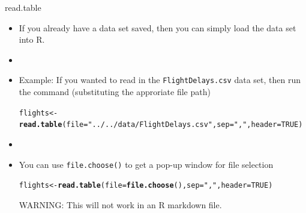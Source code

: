 \documentclass[10pt]{beamer}\usepackage[]{graphicx}\usepackage[]{color}
\makeatletter
\newcommand{\hlnum}[1]{\textcolor[rgb]{0.686,0.059,0.569}{#1}}%
\newcommand{\hlstr}[1]{\textcolor[rgb]{0.192,0.494,0.8}{#1}}%
\newcommand{\hlstd}[1]{\textcolor[rgb]{0.345,0.345,0.345}{#1}}%
\newcommand{\hlkwb}[1]{\textcolor[rgb]{0.69,0.353,0.396}{#1}}%
\newcommand{\hlkwc}[1]{\textcolor[rgb]{0.333,0.667,0.333}{#1}}%
\newcommand{\hlkwd}[1]{\textcolor[rgb]{0.737,0.353,0.396}{\textbf{#1}}}%
\newenvironment{kframe}{%
 \def\at@end@of@kframe{}%
 \ifinner\ifhmode%
  \def\at@end@of@kframe{\end{minipage}}%
  \begin{minipage}{\columnwidth}%
 \fi\fi%
 \def\FrameCommand##1{\hskip\@totalleftmargin \hskip-\fboxsep
 \colorbox{shadecolor}{##1}\hskip-\fboxsep
     \hskip-\linewidth \hskip-\@totalleftmargin \hskip\columnwidth}%
 \MakeFramed {\advance\hsize-\width
   \@totalleftmargin\z@ \linewidth\hsize
   \@setminipage}}%
 {\par\unskip\endMakeFramed%
 \at@end@of@kframe}
\newenvironment{knitrout}{}{} %
\makeatother
\begin{document}
\begin{frame}[fragile]{read.table}

\begin{itemize}
\item  If you already have a data set saved, then you can simply load
the data set into R.
\item[]
\item  Example: If you wanted to read in the \texttt{FlightDelays.csv} data set, then run the command (substituting the approriate file path)

\begin{knitrout}\scriptsize
{}\color{fgcolor}\begin{kframe}
\begin{alltt}
\hlstd{flights} \hlkwb{<-} \hlkwd{read.table}\hlstd{(}\hlkwc{file} \hlstd{=} \hlstr{"../../data/FlightDelays.csv"}\hlstd{,} \hlkwc{sep} \hlstd{=} \hlstr{","}\hlstd{,} \hlkwc{header} \hlstd{=} \hlnum{TRUE}\hlstd{)}
\end{alltt}
\end{kframe}
\end{knitrout}
\item[]
\item You can use \texttt{file.choose()} to get a pop-up window for file selection

\begin{knitrout}\scriptsize
{}\color{fgcolor}\begin{kframe}
\begin{alltt}
\hlstd{flights} \hlkwb{<-} \hlkwd{read.table}\hlstd{(}\hlkwc{file} \hlstd{=} \hlkwd{file.choose}\hlstd{(),} \hlkwc{sep} \hlstd{=} \hlstr{","}\hlstd{,} \hlkwc{header} \hlstd{=} \hlnum{TRUE}\hlstd{)}
\end{alltt}
\end{kframe}
\end{knitrout}

WARNING: This will not work in an R markdown file.

\end{itemize}

\end{frame}
\end{document}
